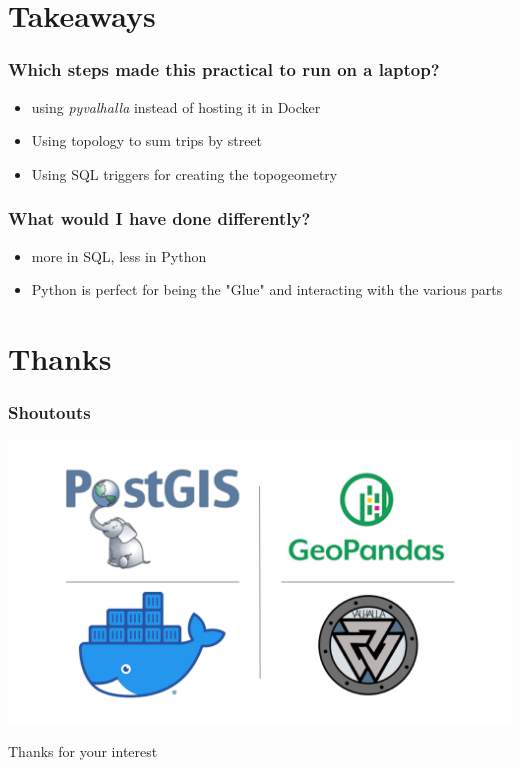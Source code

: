 \documentclass{beamer}
\begin{document}
\section{Takeaways}

\begin{frame}
    \frametitle{Which steps made this practical to run on a laptop?}

    \begin{itemize}
        \item using \emph{pyvalhalla} instead of hosting it in Docker
        \item Using topology to sum trips by street
        \item Using SQL triggers for creating the topogeometry 
    \end{itemize}
\end{frame}
\begin{frame}
    \frametitle{What would I have done differently?}

    \begin{itemize}
        \item more in SQL, less in Python
        \item Python is perfect for being the "Glue" and interacting with the various parts

    \end{itemize}
\end{frame}

\section{Thanks}

\begin{frame}
    \frametitle{Shoutouts}
\includegraphics[width=\textwidth]{logos_thanks.png}
\end{frame}
\begin{frame}
    Thanks for your interest
\end{frame}
\end{document}
